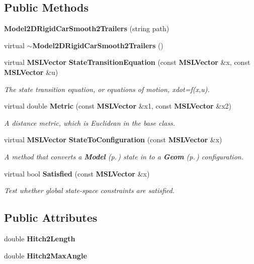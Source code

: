 \subsection*{Public Methods}
\begin{CompactItemize}
\item 
{\bf Model2DRigid\-Car\-Smooth2Trailers} (string path)
\item 
virtual {\bf $\sim$Model2DRigid\-Car\-Smooth2Trailers} ()
\item 
virtual {\bf MSLVector} {\bf State\-Transition\-Equation} (const {\bf MSLVector} \&x, const {\bf MSLVector} \&u)
\begin{CompactList}\small\item\em The state transition equation, or equations of motion, xdot=f(x,u).\item\end{CompactList}\item 
virtual double {\bf Metric} (const {\bf MSLVector} \&x1, const {\bf MSLVector} \&x2)
\begin{CompactList}\small\item\em A distance metric, which is Euclidean in the base class.\item\end{CompactList}\item 
virtual {\bf MSLVector} {\bf State\-To\-Configuration} (const {\bf MSLVector} \&x)
\begin{CompactList}\small\item\em A method that converts a {\bf Model} {\rm (p.\,\pageref{classModel})} state in to a {\bf Geom} {\rm (p.\,\pageref{classGeom})} configuration.\item\end{CompactList}\item 
virtual bool {\bf Satisfied} (const {\bf MSLVector} \&x)
\begin{CompactList}\small\item\em Test whether global state-space constraints are satisfied.\item\end{CompactList}\end{CompactItemize}
\subsection*{Public Attributes}
\begin{CompactItemize}
\item 
double {\bf Hitch2Length}
\item 
double {\bf Hitch2Max\-Angle}
\end{CompactItemize}


